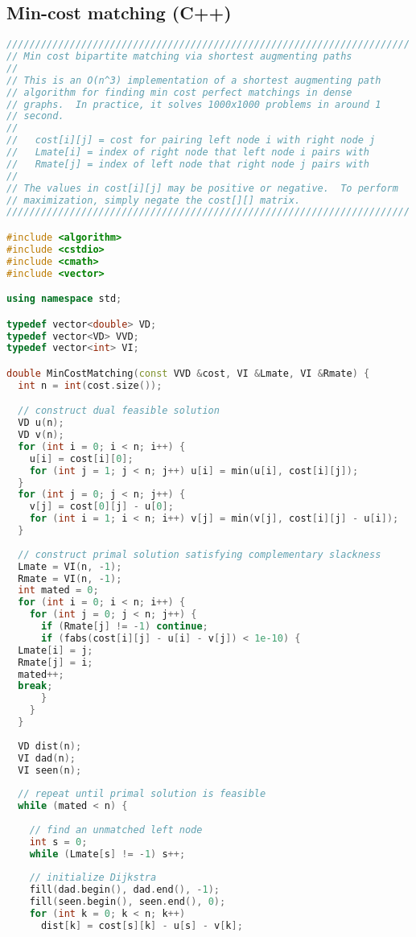 \subsection{Min-cost matching (C++)}
\begin{lstlisting}[language=C++]
//////////////////////////////////////////////////////////////////////
// Min cost bipartite matching via shortest augmenting paths
//
// This is an O(n^3) implementation of a shortest augmenting path
// algorithm for finding min cost perfect matchings in dense
// graphs.  In practice, it solves 1000x1000 problems in around 1
// second.
//
//   cost[i][j] = cost for pairing left node i with right node j
//   Lmate[i] = index of right node that left node i pairs with
//   Rmate[j] = index of left node that right node j pairs with
//
// The values in cost[i][j] may be positive or negative.  To perform
// maximization, simply negate the cost[][] matrix.
//////////////////////////////////////////////////////////////////////

#include <algorithm>
#include <cstdio>
#include <cmath>
#include <vector>

using namespace std;

typedef vector<double> VD;
typedef vector<VD> VVD;
typedef vector<int> VI;

double MinCostMatching(const VVD &cost, VI &Lmate, VI &Rmate) {
  int n = int(cost.size());

  // construct dual feasible solution
  VD u(n);
  VD v(n);
  for (int i = 0; i < n; i++) {
    u[i] = cost[i][0];
    for (int j = 1; j < n; j++) u[i] = min(u[i], cost[i][j]);
  }
  for (int j = 0; j < n; j++) {
    v[j] = cost[0][j] - u[0];
    for (int i = 1; i < n; i++) v[j] = min(v[j], cost[i][j] - u[i]);
  }
  
  // construct primal solution satisfying complementary slackness
  Lmate = VI(n, -1);
  Rmate = VI(n, -1);
  int mated = 0;
  for (int i = 0; i < n; i++) {
    for (int j = 0; j < n; j++) {
      if (Rmate[j] != -1) continue;
      if (fabs(cost[i][j] - u[i] - v[j]) < 1e-10) {
  Lmate[i] = j;
  Rmate[j] = i;
  mated++;
  break;
      }
    }
  }
  
  VD dist(n);
  VI dad(n);
  VI seen(n);
  
  // repeat until primal solution is feasible
  while (mated < n) {
    
    // find an unmatched left node
    int s = 0;
    while (Lmate[s] != -1) s++;
    
    // initialize Dijkstra
    fill(dad.begin(), dad.end(), -1);
    fill(seen.begin(), seen.end(), 0);
    for (int k = 0; k < n; k++) 
      dist[k] = cost[s][k] - u[s] - v[k];
    

\end{lstlisting}
